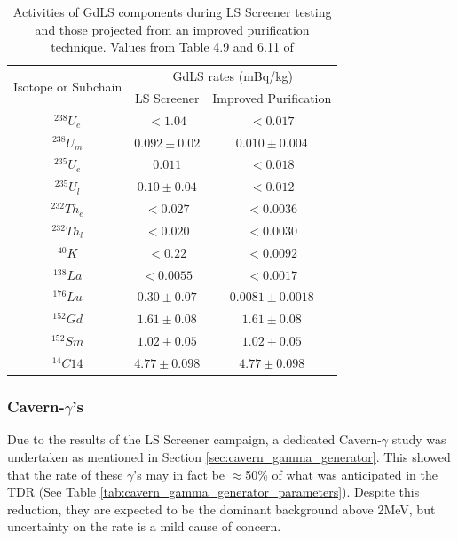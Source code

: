 \begin{table}[!htbp]
    \centering
    \begin{tabular}{c|c|c}
        \multirow{2}{*}{Isotope or Subchain}  &  \multicolumn{2}{c}{GdLS rates (mBq/kg)}      \\ 
                             &  LS Screener          & Improved Purification \\ \hline
        ${}^{238}U_{e}$      &  $< 1.04$             & $< 0.017$             \\ 
        ${}^{238}U_{m}$      &  $0.092\pm0.02$       & $0.010\pm0.004$       \\
        ${}^{235}U_{e}$      &  $0.011$              & $< 0.018$             \\
        ${}^{235}U_{l}$      &  $0.10\pm0.04$        & $< 0.012$             \\
        ${}^{232}Th_{e}$     &  $< 0.027$            & $< 0.0036$            \\
        ${}^{232}Th_{l}$     &  $< 0.020$            & $< 0.0030$            \\
        ${}^{40}K$           &  $< 0.22$             & $< 0.0092$            \\
        ${}^{138}La$         &  $< 0.0055$           & $< 0.0017$            \\
        ${}^{176}Lu$         &  $0.30\pm0.07$        & $0.0081\pm0.0018$     \\
        ${}^{152}{Gd}$       &  $1.61\pm0.08$        & $1.61\pm0.08$         \\
        ${}^{152}{Sm}$       &  $1.02\pm0.05$        & $1.02\pm0.05$         \\
        ${}^{14}{C14}$       &  $4.77\pm0.098$       & $4.77\pm0.098$ 
    \end{tabular}
    \caption{Activities of GdLS components during LS Screener testing and those projected from an improved purification technique. Values from Table 4.9 and 6.11 of \cite{scotthaselschwardt_thesis_ref}}
    \label{tab:gdls_assay_rates}
\end{table}




\subsubsection{Cavern-$\gamma$'s}
\par
Due to the results of the LS Screener campaign, a dedicated Cavern-$\gamma$ study was undertaken as mentioned in Section \ref{sec:cavern_gamma_generator}.
This showed that the rate of these $\gamma$'s may in fact be $\approx$50\% of what was anticipated in the TDR \cite{LZ_TechnicalDesignReview_ref} (See Table \ref{tab:cavern_gamma_generator_parameters}).
Despite this reduction, they are expected to be the dominant background above 2MeV, but uncertainty on the rate is a mild cause of concern.

